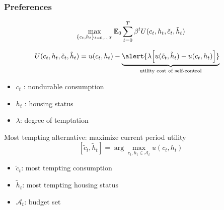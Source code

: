 \documentclass[10pt,english,t,10pt]{beamer}
\begin{document}
\begin{frame}[label=Preferences]
\frametitle{Preferences}
\begin{equation}
\max_{ \{ c_t, h_t \}_{t=0,..,T} } \mathbb{E}_0 \sum_{t=0}^{T}\beta^t U(c_t, h_t, \tilde{c}_t,\tilde{h}_t)
\nonumber
\vspace{-2mm}
\end{equation}

\pause

\begin{align*}
U(c_t, h_t, \tilde{c}_t,\tilde{h}_t)&=u(c_t,h_t) - \underbrace{    \alert{\lambda\Big[u(\tilde{c}_t,\tilde{h}_t)-u(c_t,h_t)\Big]}    }_\text{utility cost of self-control}
\end{align*}
\vspace*{-3ex}
\begin{itemize}
\item {\footnotesize $c_t$ : nondurable consumption}
\item {\footnotesize $h_t$ : housing status}
\item {\footnotesize $\lambda$: degree of temptation}
\end{itemize}

\pause
\medskip \medskip \medskip
\alert{Most tempting alternative}: maximize current period utility
$$\left[\tilde{c}_t, \tilde{h}_t \right]     = \arg\max_{c_t, h_t\in\mathscr{A}_t} u(c_t,h_t)$$
\vspace*{-3ex}
\begin{itemize}
\item {\footnotesize $\tilde{c}_t$: most tempting consumption}
\item {\footnotesize $\tilde{h}_t$: most tempting housing status}
\item {\footnotesize $\mathscr{A}_t$: budget set}


\end{itemize}
\end{frame}
\end{document}
